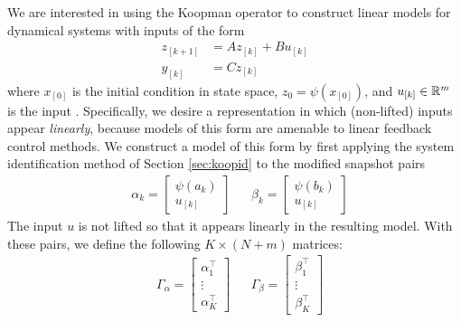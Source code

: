 We are interested in using the Koopman operator  to construct linear models for dynamical systems with inputs of the form 
\begin{equation}
\begin{aligned}
    z_{[k+1]} &= A z_{[k]} + B u_{[k]} \\
    y_{[k]} &= C z_{[k]}
    \label{eq:linSys}
\end{aligned}
\end{equation}
where $x_{[0]}$ is the initial condition in state space, $z_0 = \psi(x_{[0]})$, and $u_{[k]} \in \mathbb{R}^m$ is the input .
Specifically, we desire a representation in which (non-lifted) inputs appear \emph{linearly}, because models of this form are amenable to linear feedback control methods.
We construct a model of this form by first applying the system identification method of Section \ref{sec:koopid} to the modified snapshot pairs 
\begin{align}
    &\alpha_k = \begin{bmatrix} \psi(a_k) \\ u_{[k]} \end{bmatrix} 
    &&\beta_k = \begin{bmatrix} \psi(b_k) \\ u_{[k]} \end{bmatrix} 
\end{align}
The input $u$ is not lifted so that it appears linearly in the resulting model.
With these pairs, we define the following ${K \times (N + m)}$ matrices:
\begin{align}
    &\Gamma_\alpha = \begin{bmatrix} \alpha_1^\top \\ \vdots \\  \alpha_K^\top \end{bmatrix}
    &&\Gamma_\beta = \begin{bmatrix} \beta_1^\top \\ \vdots \\  \beta_K^\top \end{bmatrix}
    \label{eq:Gamma}
\end{align}
